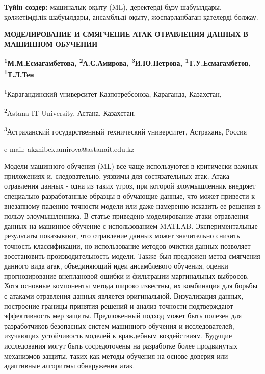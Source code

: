 {\bfseries Түйін сөздер:} машиналық оқыту (ML), деректерді бұзу шабуылдары,
қолжетімділік шабуылдары, ансамбльді оқыту, жоспарланбаған қателерді
болжау.

\begin{articleheader}
{\bfseries МОДЕЛИРОВАНИЕ И СМЯГЧЕНИЕ АТАК ОТРАВЛЕНИЯ ДАННЫХ В МАШИННОМ ОБУЧЕНИИ}

{\bfseries
\textsuperscript{1}М.М.Есмагамбетова,
\textsuperscript{2}А.С.Амирова\textsuperscript{\envelope },
\textsuperscript{3}И.Ю.Петрова,
\textsuperscript{1}Т.У.Есмагамбетов,
\textsuperscript{1}Т.Л.Тен
}
\end{articleheader}

\begin{affiliation}
\textsuperscript{1}Карагандинский университет Казпотребсоюза, Караганда, Казахстан,

\textsuperscript{2}Astana IT University, Астана, Казахстан,

\textsuperscript{3}Астраханский государственный технический университет, Астрахань, Россия

e-mail: akzhibek.amirova@astanait.edu.kz
\end{affiliation}

Модели машинного обучения (ML) все чаще используются в критически важных
приложениях и, следовательно, уязвимы для состязательных атак. Атака
отравления данных - одна из таких угроз, при которой злоумышленник
внедряет специально разработанные образцы в обучающие данные, что может
привести к внезапному падению точности модели или даже намеренно
исказить ее решения в пользу злоумышленника. В статье приведено
моделирование атаки отравления данных на машинное обучение с
использованием MATLAB. Экспериментальные результаты показывают, что
отравление данных может значительно снизить точность классификации, но
использование методов очистки данных позволяет восстановить
производительность модели. Также был предложен метод смягчения данного
вида атак, объединяющий идеи ансамблевого обучения, оценки
прогнозирование внеплановой ошибки и фильтрации маргинальных выбросов.
Хотя основные компоненты метода широко известны, их комбинация для
борьбы с атаками отравления данных является оригинальной. Визуализация
данных, построение границы принятия решений и анализ точности
подтверждают эффективность мер защиты. Предложенный подход может быть
полезен для разработчиков безопасных систем машинного обучения и
исследователей, изучающих устойчивость моделей к враждебным
воздействиям. Будущие исследования могут быть сосредоточены на
разработке более продвинутых механизмов защиты, таких как методы
обучения на основе доверия или адаптивные алгоритмы обнаружения атак.

